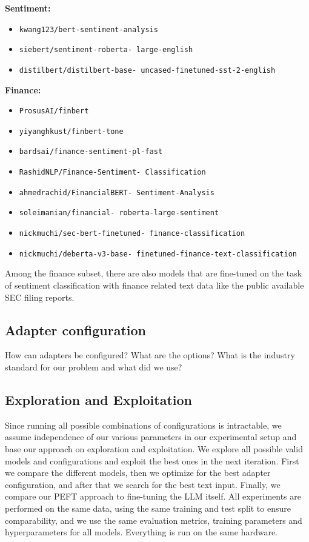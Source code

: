 \documentclass[conference]{IEEEtran}
\begin{document}
\noindent
\textbf{Sentiment:}
\begin{itemize}
\item \texttt{kwang123/bert-sentiment-analysis}
\item \texttt{siebert/sentiment-roberta- large-english}
\item \texttt{distilbert/distilbert-base- uncased-finetuned-sst-2-english}
\end{itemize}

\noindent
\textbf{Finance:}
\begin{itemize}
\item \texttt{ProsusAI/finbert}
\item \texttt{yiyanghkust/finbert-tone}
\item \texttt{bardsai/finance-sentiment-pl-fast}
\item \texttt{RashidNLP/Finance-Sentiment- Classification}
\item \texttt{ahmedrachid/FinancialBERT- Sentiment-Analysis}
\item \texttt{soleimanian/financial- roberta-large-sentiment}
\item \texttt{nickmuchi/sec-bert-finetuned- finance-classification}
\item \texttt{nickmuchi/deberta-v3-base- finetuned-finance-text-classification}
\end{itemize}

Among the finance subset, there are also models that are fine-tuned on the task of sentiment classification with finance related text data like the public available SEC filing reports.
\subsection{Adapter configuration}%
How can adapters be configured? What are the options? What is the industry standard for our problem and what did we use?
\subsection{Exploration and Exploitation}%
Since running all possible combinations of configurations is intractable, we assume independence of our various parameters in our experimental setup and base our approach on exploration and exploitation. We explore all possible valid models and configurations and exploit the best ones in the next iteration. First we compare the different models, then we optimize for the best adapter configuration, and after that we search for the best text input. Finally, we compare our PEFT approach to fine-tuning the LLM itself. 
All experiments are performed on the same data, using the same training and test split to ensure comparability, and we use the same evaluation metrics, training parameters and hyperparameters for all models. Everything is run on the same hardware.
\end{document}
